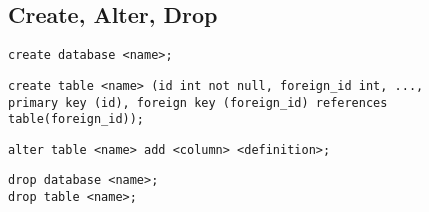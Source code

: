 \subsection{Create, Alter, Drop}

\begin{lstlisting}[caption=create database]
create database <name>;
\end{lstlisting}

\begin{lstlisting}[caption=create table]
create table <name> (id int not null, foreign_id int, ...,
primary key (id), foreign key (foreign_id) references table(foreign_id));
\end{lstlisting}

\begin{lstlisting}[caption=alter table]
alter table <name> add <column> <definition>;
\end{lstlisting}

\begin{lstlisting}[caption=drop]
drop database <name>;
drop table <name>;
\end{lstlisting}

